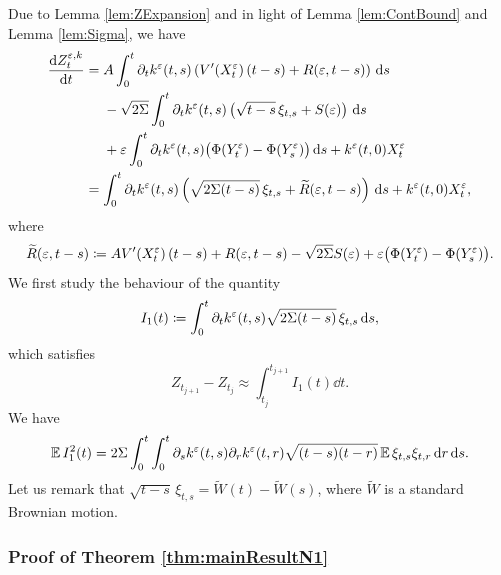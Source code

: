 \documentclass[10pt]{article}
\begin{document}
Due to Lemma \ref{lem:ZExpansion} and in light of Lemma \ref{lem:ContBound} and Lemma \ref{lem:Sigma}, we have
\begin{equation}
\begin{aligned}
	\frac{\mathrm{d} Z^{\varepsilon,k}_t}{\mathrm{d} t} &= 
	\begin{aligned}[t] 
	&A \int_0^t \partial_t k^\varepsilon(t, s) \left( V'(X^\varepsilon_t)\,(t-s) + R(\varepsilon, t-s)\right) \,\mathrm{d} s  \\
	&-\sqrt{2\Sigma} \int_0^t \partial_t k^\varepsilon(t, s) \left( \sqrt{t-s} \, \xi_{t,s} + S(\varepsilon) \right)\,\mathrm{d} s\\
	&+ \varepsilon \int_0^t \partial_t k^\varepsilon(t, s) \big(\Phi(Y^\varepsilon_t)- \Phi(Y^\varepsilon_s)\big) \,\mathrm{d} s + k^\varepsilon(t, 0) X^\varepsilon_t
	\end{aligned}
	\\
	&= \int_0^t \partial_t k^\varepsilon(t, s)\left(\sqrt{2\Sigma(t-s)} \, \xi_{t,s} + \widetilde R(\varepsilon, t - s)\right) \,\mathrm{d} s + k^\varepsilon(t, 0) X^\varepsilon_t,
\end{aligned}
\end{equation}
where
\begin{equation}
	\widetilde R(\varepsilon, t - s) \coloneqq AV'(X^\varepsilon_t)\,(t-s) + R(\varepsilon, t-s) - \sqrt{2\Sigma} S(\varepsilon) + \varepsilon \big(\Phi(Y^\varepsilon_t)- \Phi(Y^\varepsilon_s)\big).
\end{equation}
We first study the behaviour of the quantity
\begin{equation}
	I_1(t) \coloneqq \int_0^t \partial_t k^\varepsilon(t, s) \sqrt{2\Sigma(t-s)} \, \xi_{t,s} \,\mathrm{d} s,
\end{equation}
which satisfies
\begin{equation}
	Z_{t_{j+1}} - Z_{t_j} \approx \int_{t_j}^{t_{j+1}} I_1(t) \dd t.	
\end{equation}
We have
\begin{equation}
	\operatorname{\mathbb{E}} I_1^2(t) = 2 \Sigma \int_0^t \int_0^t \partial_s k^\varepsilon(t, s) \partial_r k^\varepsilon(t, r) \sqrt{(t- s)(t-r)} \operatorname{\mathbb{E}} \xi_{t,s}\xi_{t,r} \,\mathrm{d} r \,\mathrm{d} s.
\end{equation}
Let us remark that $\sqrt{t-s}\, \xi_{t,s} = \widetilde W(t) - \widetilde W(s)$, where $\widetilde W$ is a standard Brownian motion.

\subsubsection{Proof of Theorem \ref{thm:mainResultN1}}
\end{document}
